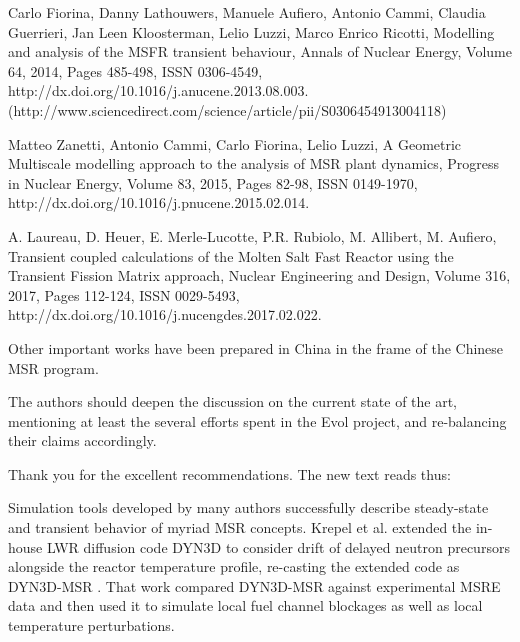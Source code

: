 \documentclass[answers,11pt]{exam}
\begin{document}
\begin{questions}
Carlo Fiorina, Danny Lathouwers, Manuele Aufiero, Antonio Cammi, Claudia Guerrieri, Jan Leen Kloosterman, Lelio Luzzi, Marco Enrico Ricotti, Modelling and analysis of the MSFR transient behaviour, Annals of Nuclear Energy, Volume 64, 2014, Pages 485-498, ISSN 0306-4549, http://dx.doi.org/10.1016/j.anucene.2013.08.003.
(http://www.sciencedirect.com/science/article/pii/S0306454913004118)

Matteo Zanetti, Antonio Cammi, Carlo Fiorina, Lelio Luzzi, A Geometric Multiscale modelling approach to the analysis of MSR plant dynamics, Progress in Nuclear Energy, Volume 83, 2015, Pages 82-98, ISSN 0149-1970, http://dx.doi.org/10.1016/j.pnucene.2015.02.014.

A. Laureau, D. Heuer, E. Merle-Lucotte, P.R. Rubiolo, M. Allibert, M. Aufiero, Transient coupled calculations of the Molten Salt Fast Reactor using the Transient Fission Matrix approach, Nuclear Engineering and Design, Volume 316, 2017, Pages 112-124, ISSN 0029-5493, http://dx.doi.org/10.1016/j.nucengdes.2017.02.022.

Other important works have been prepared in China in the frame of the Chinese MSR program.

The authors should deepen the discussion on the current state of the art, mentioning at least the several efforts spent in the Evol project, and re-balancing their claims accordingly.
\begin{solution}
        Thank you for the excellent recommendations. The new text reads thus:


        Simulation tools developed by many authors successfully describe 
        steady-state and
        transient behavior of myriad MSR concepts. Krepel et al. extended 
        the in-house LWR
        diffusion code DYN3D to consider drift of delayed neutron precursors 
        alongside
        the reactor temperature profile, re-casting the extended code as
        DYN3D-MSR \cite{krepel_dyn3d-msr_2007}. That work compared DYN3D-MSR 
        against
        experimental MSRE data and then used it to simulate local fuel 
        channel
        blockages as well as local temperature perturbations. 


\end{solution}
\end{questions}
\end{document}
